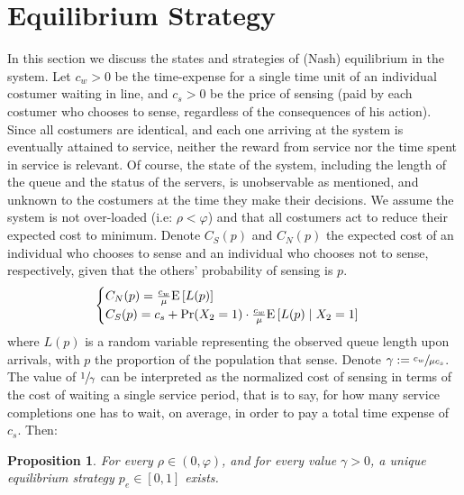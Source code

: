 \documentclass[11pt]{article}
\numberwithin{equation}{section}
\newtheorem{proposition}{Proposition}[section]
\newcommand{\pr}{{\rm Pr}}
\newcommand{\e}{{\rm E}}
\begin{document}
\section{Equilibrium Strategy}
In this section we discuss the states and strategies of (Nash) equilibrium in the system. Let $c_{w}>0$ be the time-expense for a single time unit of an individual costumer waiting in line, and $c_{s}>0$ be the price of sensing (paid by each costumer who chooses to sense, regardless of the consequences of his action). Since all costumers are identical, and each one arriving at the system is eventually attained to service, neither the reward from service nor the time spent in service is relevant. Of course, the state of the system, including the length of the queue and the status of the servers, is unobservable as mentioned, and unknown to the costumers at the time they make their decisions. We assume the system is not over-loaded (i.e: $\rho<\varphi$) and that all costumers act to reduce their expected cost to minimum. Denote $C_{S}(p)$ and $C_{N}(p)$ the expected cost of an individual who chooses to sense and an individual who chooses not to sense, respectively, given that the others' probability of sensing is $p$.
\begin{equation}\begin{cases}
 	C_{N}(p) = \frac{c_{w}}{\mu}\e\left[L(p)\right] \\
	C_{S}(p) = c_{s} + \pr(X_2=1) \cdot \frac{c_{w}}{\mu} \e\left[L(p)\mid X_{2}=1\right] 
\end{cases}
\label{LossFunc}
\end{equation}
where $L(p)$ is a random variable representing the observed queue length upon arrivals, with $p$ the proportion of the population that sense. Denote $\gamma :=\sfrac{c_{w}}{\mu c_{s}}$. The value of $\sfrac{1}{\gamma}$ can be interpreted as the normalized cost of sensing in terms of the cost of waiting a single service period, that is to say, for how many service completions one has to wait, on average, in order to pay a total time expense of $c_{s}$. Then:

\begin{proposition} For every $\rho\in(0,\varphi)$, and for every value $\gamma>0$, a unique equilibrium strategy $p_{e}\in[0,1]$ exists.
\end{proposition}
\end{document}
